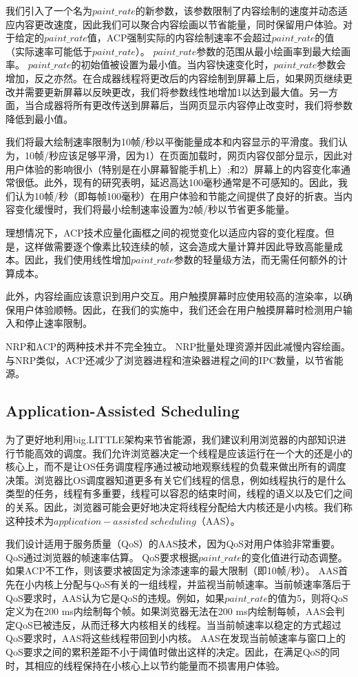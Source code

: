 \documentclass{sig-alternate-05-2015}
\begin{document}
我们引入了一个名为$paint\_rate$的新参数，该参数限制了内容绘制的速度并动态适应内容更改速度，因此我们可以聚合内容绘画以节省能量，同时保留用户体验。对于给定的$paint\_rate$值，ACP强制实际的内容绘制速率不会超过$paint\_rate$的值（实际速率可能低于$paint\_rate$）。 $paint\_rate$参数的范围从最小绘画率到最大绘画率。 $paint\_rate$的初始值被设置为最小值。当内容快速变化时，$paint\_rate$参数会增加，反之亦然。在合成器线程将更改后的内容绘制到屏幕上后，如果网页继续更改并需要更新屏幕以反映更改，我们将参数线性地增加1以达到最大值。另一方面，当合成器将所有更改传送到屏幕后，当网页显示内容停止改变时，我们将参数降低到最小值。

我们将最大绘制速率限制为10帧/秒以平衡能量成本和内容显示的平滑度。我们认为，10帧/秒应该足够平滑，因为1）在页面加载时，网页内容仅部分显示，因此对用户体验的影响很小（特别是在小屏幕智能手机上）;和2）屏幕上的内容变化率通常很低。此外，现有的研究\cite{39}表明，延迟高达100毫秒通常是不可感知的。因此，我们认为10帧/秒（即每帧100毫秒）在用户体验和节能之间提供了良好的折衷。当内容变化缓慢时，我们将最小绘制速率设置为2帧/秒以节省更多能量。

理想情况下，ACP技术应量化画框之间的视觉变化以适应内容的变化程度。但是，这样做需要逐个像素比较连续的帧，这会造成大量计算并因此导致高能量成本。因此，我们使用线性增加$paint\_rate$参数的轻量级方法，而无需任何额外的计算成本。

此外，内容绘画应该意识到用户交互。用户触摸屏幕时应使用较高的渲染率，以确保用户体验顺畅。因此，在我们的实施中，我们还会在用户触摸屏幕时检测用户输入和停止速率限制。

NRP和ACP的两种技术并不完全独立。 NRP批量处理资源并因此减慢内容绘画。与NRP类似，ACP还减少了浏览器进程和渲染器进程之间的IPC数量，以节省能源。


\subsection{Application-Assisted Scheduling}

为了更好地利用big.LITTLE架构来节省能源，我们建议利用浏览器的内部知识进行节能高效的调度。我们允许浏览器决定一个线程是应该运行在一个大的还是小的核心上，而不是让OS任务调度程序通过被动地观察线程的负载来做出所有的调度决策。浏览器比OS调度器知道更多有关它们线程的信息，例如线程执行的是什么类型的任务，线程有多重要，线程可以容忍的结束时间，线程的语义以及它们之间的关系。因此，浏览器可能会更好地决定将线程分配给大内核还是小内核。我们称这种技术为$application-assisted\ scheduling$（AAS）\cite{1}。

我们设计适用于服务质量（QoS）的AAS技术，因为QoS对用户体验非常重要。 QoS通过浏览器的帧速率估算。 QoS要求根据$paint\_rate$的变化值进行动态调整。如果ACP不工作，则该要求被固定为涂漆速率的最大限制（即10帧/秒）。 AAS首先在小内核上分配与QoS有关的一组线程，并监视当前帧速率。当前帧速率落后于QoS要求时，AAS认为它是QoS的违规。例如，如果$paint\_rate$的值为5，则将QoS定义为在200 ms内绘制每个帧。如果浏览器无法在200 ms内绘制每帧，AAS会判定QoS已被违反，从而迁移大内核相关的线程。当当前帧速率以稳定的方式超过QoS要求时，AAS将这些线程带回到小内核。 AAS在发现当前帧速率与窗口上的QoS要求之间的累积差距不小于阈值时做出这样的决定。因此，在满足QoS的同时，其相应的线程保持在小核心上以节约能量而不损害用户体验。
\end{document}

